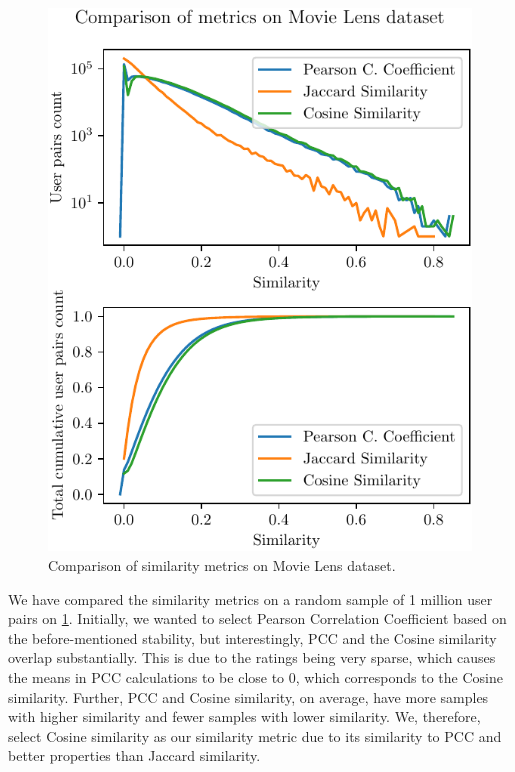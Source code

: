 \begin{figure}[ht!]
    \centering
    \includegraphics{img/figures/similarity_metrics.pdf}
    \caption{Comparison of similarity metrics on Movie Lens dataset.}
    \label{fig:similarity_metrics}
\end{figure}

We have compared the similarity metrics on a random sample of 1 million user pairs on \ref{fig:similarity_metrics}. Initially, we wanted to select Pearson Correlation Coefficient based on the before-mentioned stability, but interestingly, PCC and the Cosine similarity overlap substantially. This is due to the ratings being very sparse, which causes the means in PCC calculations to be close to 0, which corresponds to the Cosine similarity. Further, PCC and Cosine similarity, on average, have more samples with higher similarity and fewer samples with lower similarity. We, therefore, select Cosine similarity as our similarity metric due to its similarity to PCC and better properties than Jaccard similarity.

